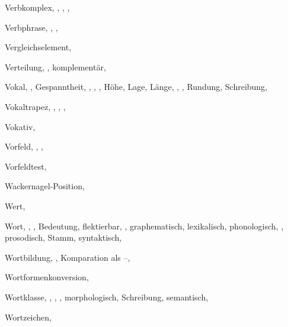 \begin{theindex}
  \item Verbkomplex, , , , 
  \item Verbphrase, , , 
  \item Vergleichselement, 
  \item Verteilung, , 
    \subitem komplementär, 
  \item Vokal, , 
    \subitem Gespanntheit, , , 
		, 
    \subitem Höhe, 
    \subitem Lage, 
    \subitem Länge, , , 
    \subitem Rundung, 
    \subitem Schreibung, 
  \item Vokaltrapez, , , , 
  \item Vokativ, 
  \item Vorfeld, , , 
  \item Vorfeldtest, 

  \indexspace

  \item Wackernagel-Position, 
  \item Wert, 
  \item Wort, , , 
    \subitem Bedeutung, 
    \subitem flektierbar, , 
    \subitem graphematisch, 
    \subitem lexikalisch, 
    \subitem phonologisch, , 
    \subitem prosodisch, 
    \subitem Stamm, 
    \subitem syntaktisch, 
  \item Wortbildung, , 
    \subitem Komparation als --, 
  \item Wortformenkonversion, 
\newpage
  \item Wortklasse, , , , 
    \subitem morphologisch, 
    \subitem Schreibung, 
    \subitem semantisch, 
  \item Wortzeichen, 

  \indexspace


\end{theindex}
